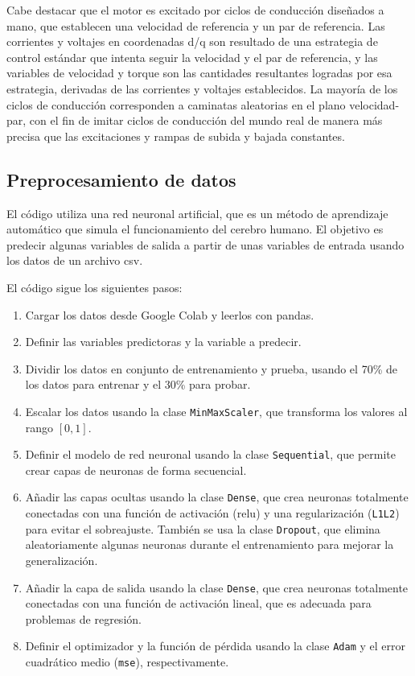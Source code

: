 \documentclass{article}
\begin{document}
Cabe destacar que el motor es excitado por ciclos de conducción diseñados a mano, que establecen una velocidad de referencia y un par de referencia. Las corrientes y voltajes en coordenadas d/q son resultado de una estrategia de control estándar que intenta seguir la velocidad y el par de referencia, y las variables de velocidad y torque son las cantidades resultantes logradas por esa estrategia, derivadas de las corrientes y voltajes establecidos. La mayoría de los ciclos de conducción corresponden a caminatas aleatorias en el plano velocidad-par, con el fin de imitar ciclos de conducción del mundo real de manera más precisa que las excitaciones y rampas de subida y bajada constantes.




\subsection{Preprocesamiento de datos}


El código utiliza una red neuronal artificial, que es un método de aprendizaje automático que simula el funcionamiento del cerebro humano. El objetivo es predecir algunas variables de salida a partir de unas variables de entrada  usando los datos de un archivo csv.

El código sigue los siguientes pasos:

\begin{enumerate}
\item Cargar los datos desde Google Colab y leerlos con pandas.
\item Definir las variables predictoras y la variable a predecir.
\item Dividir los datos en conjunto de entrenamiento y prueba, usando el 70\% de los datos para entrenar y el 30\% para probar.
\item Escalar los datos usando la clase \lstinline{MinMaxScaler}, que transforma los valores al rango $[0, 1]$.
\item Definir el modelo de red neuronal usando la clase \lstinline{Sequential}, que permite crear capas de neuronas de forma secuencial.
\item Añadir las capas ocultas usando la clase \lstinline{Dense}, que crea neuronas totalmente conectadas con una función de activación ($\text{relu}$) y una regularización (\lstinline{L1L2}) para evitar el sobreajuste. También se usa la clase \lstinline{Dropout}, que elimina aleatoriamente algunas neuronas durante el entrenamiento para mejorar la generalización.
\item Añadir la capa de salida usando la clase \lstinline{Dense}, que crea neuronas totalmente conectadas con una función de activación lineal, que es adecuada para problemas de regresión.
\item Definir el optimizador y la función de pérdida usando la clase \lstinline{Adam} y el error cuadrático medio (\lstinline{mse}), respectivamente.
\end{enumerate}
\end{document}
